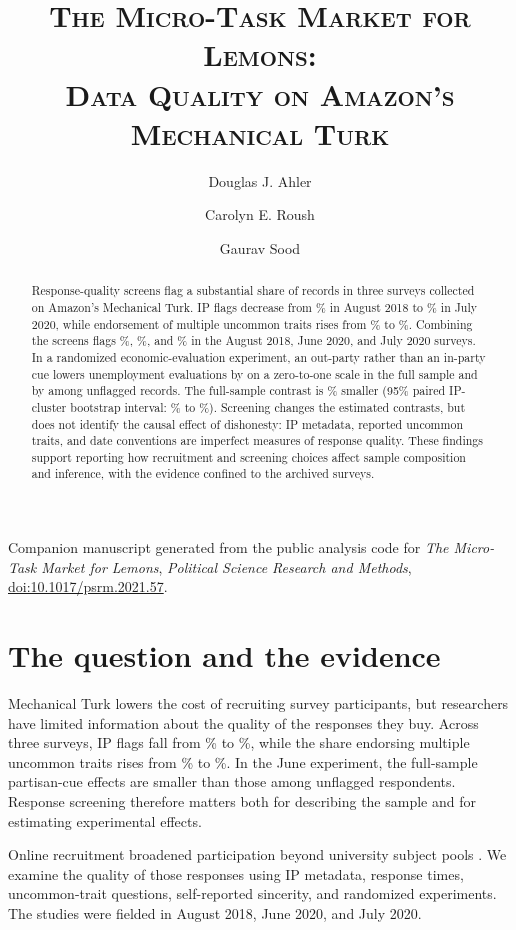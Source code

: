 \documentclass[11pt]{article}
\title{\scshape The Micro-Task Market for Lemons:\\Data Quality on Amazon's Mechanical Turk}
\author{Douglas J. Ahler \and Carolyn E. Roush \and Gaurav Sood}
\date{}
\begin{document}
\maketitle
\begin{abstract}
\noindent Response-quality screens flag a substantial share of records in three surveys collected on Amazon's Mechanical Turk. IP flags decrease from \IpOne\% in August 2018 to \IpThree\% in July 2020, while endorsement of multiple uncommon traits rises from \RareOne\% to \RareThree\%. Combining the screens flags \CombinedOne\%, \CombinedTwo\%, and \CombinedThree\% in the August 2018, June 2020, and July 2020 surveys. In a randomized economic-evaluation experiment, an out-party rather than an in-party cue lowers unemployment evaluations by \AllJobs{} on a zero-to-one scale in the full sample and by \CleanJobs{} among unflagged records. The full-sample contrast is \ReductionJobs\% smaller (95\% paired IP-cluster bootstrap interval: \ReductionLowJobs\% to \ReductionHighJobs\%). Screening changes the estimated contrasts, but does not identify the causal effect of dishonesty: IP metadata, reported uncommon traits, and date conventions are imperfect measures of response quality. These findings support reporting how recruitment and screening choices affect sample composition and inference, with the evidence confined to the archived surveys.
\end{abstract}
\noindent\small Companion manuscript generated from the public analysis code for \emph{The Micro-Task Market for Lemons}, \emph{Political Science Research and Methods}, \href{https://doi.org/10.1017/psrm.2021.57}{doi:10.1017/psrm.2021.57}.\normalsize

\section{The question and the evidence}

Mechanical Turk lowers the cost of recruiting survey participants, but researchers have limited information about the quality of the responses they buy. Across three surveys, IP flags fall from \IpOne\% to \IpThree\%, while the share endorsing multiple uncommon traits rises from \RareOne\% to \RareThree\%. In the June experiment, the full-sample partisan-cue effects are smaller than those among unflagged respondents. Response screening therefore matters both for describing the sample and for estimating experimental effects.

Online recruitment broadened participation beyond university subject pools \citep{sears_1986,berinsky_2012,paolacci_2010}. We examine the quality of those responses using IP metadata, response times, uncommon-trait questions, self-reported sincerity, and randomized experiments. The studies were fielded in August 2018, June 2020, and July 2020.
\end{document}
